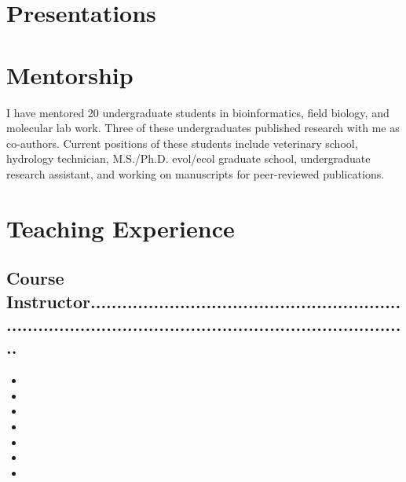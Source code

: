 \documentclass[11pt,a4paper,sans]{moderncv}        %
\begin{document}
\section{Presentations}
\begin{refsection}
\nocite{*}
\printbibliography[heading=none]
\end{refsection}

\section{Mentorship}
I have mentored 20 undergraduate students in bioinformatics, field biology, and molecular lab work. Three of these undergraduates published research with me as co-authors. Current positions of these students include veterinary school, hydrology technician, M.S./Ph.D. evol/ecol graduate school, undergraduate research assistant, and working on manuscripts for peer-reviewed publications.

\section{Teaching Experience}
\subsection{{Course Instructor}\footnotesize{........................................................................................................................................}}
\begin{itemize}
\item{}
\item{}
\item{}
\item{}
\item{}
    \item{}
    \item{}
\end{itemize}
\end{document}
